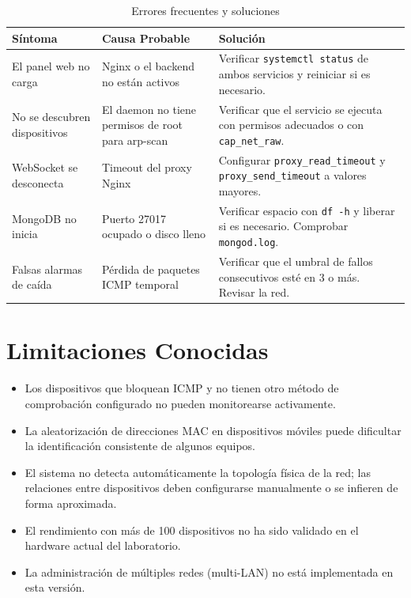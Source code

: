 \documentclass[12pt,a4paper]{report}
\begin{document}
\begin{table}[htbp]
\centering
\caption{Errores frecuentes y soluciones}\label{tab:errores}
\small
\begin{tabularx}{\textwidth}{p{3.5cm} p{3.5cm} X}
\toprule
\textbf{Síntoma} & \textbf{Causa Probable} & \textbf{Solución} \\
\midrule
El panel web no carga & Nginx o el backend no están activos & Verificar \texttt{systemctl status} de ambos servicios y reiniciar si es necesario. \\
\midrule
No se descubren dispositivos & El daemon no tiene permisos de root para arp-scan & Verificar que el servicio se ejecuta con permisos adecuados o con \texttt{cap\_net\_raw}. \\
\midrule
WebSocket se desconecta & Timeout del proxy Nginx & Configurar \texttt{proxy\_read\_timeout} y \texttt{proxy\_send\_timeout} a valores mayores. \\
\midrule
MongoDB no inicia & Puerto 27017 ocupado o disco lleno & Verificar espacio con \texttt{df -h} y liberar si es necesario. Comprobar \texttt{mongod.log}. \\
\midrule
Falsas alarmas de caída & Pérdida de paquetes ICMP temporal & Verificar que el umbral de fallos consecutivos esté en 3 o más. Revisar la red. \\
\bottomrule
\end{tabularx}
\end{table}

\section{Limitaciones Conocidas}

\begin{itemize}
  \item Los dispositivos que bloquean ICMP y no tienen otro método de comprobación configurado no pueden monitorearse activamente.
  \item La aleatorización de direcciones MAC en dispositivos móviles puede dificultar la identificación consistente de algunos equipos.
  \item El sistema no detecta automáticamente la topología física de la red; las relaciones entre dispositivos deben configurarse manualmente o se infieren de forma aproximada.
  \item El rendimiento con más de 100 dispositivos no ha sido validado en el hardware actual del laboratorio.
  \item La administración de múltiples redes (multi-LAN) no está implementada en esta versión.
\end{itemize}
\end{document}
